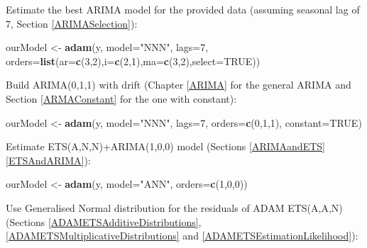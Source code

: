 \documentclass[]{book}
\newenvironment{Shaded}{\begin{snugshade}}{\end{snugshade}}
\newcommand{\DataTypeTok}[1]{\textcolor[rgb]{0.13,0.29,0.53}{#1}}
\newcommand{\DecValTok}[1]{\textcolor[rgb]{0.00,0.00,0.81}{#1}}
\newcommand{\KeywordTok}[1]{\textcolor[rgb]{0.13,0.29,0.53}{\textbf{#1}}}
\newcommand{\NormalTok}[1]{#1}
\newcommand{\OtherTok}[1]{\textcolor[rgb]{0.56,0.35,0.01}{#1}}
\newcommand{\StringTok}[1]{\textcolor[rgb]{0.31,0.60,0.02}{#1}}
\theoremstyle{definition}
\theoremstyle{definition}
\theoremstyle{definition}
\theoremstyle{definition}
\theoremstyle{remark}
\begin{document}
Estimate the best ARIMA model for the provided data (assuming seasonal lag of 7, Section \ref{ARIMASelection}):

\begin{Shaded}
\begin{Highlighting}[]
\NormalTok{ourModel <-}\StringTok{ }\KeywordTok{adam}\NormalTok{(y, }\DataTypeTok{model=}\StringTok{"NNN"}\NormalTok{, }\DataTypeTok{lags=}\DecValTok{7}\NormalTok{,}
                 \DataTypeTok{orders=}\KeywordTok{list}\NormalTok{(}\DataTypeTok{ar=}\KeywordTok{c}\NormalTok{(}\DecValTok{3}\NormalTok{,}\DecValTok{2}\NormalTok{),}\DataTypeTok{i=}\KeywordTok{c}\NormalTok{(}\DecValTok{2}\NormalTok{,}\DecValTok{1}\NormalTok{),}\DataTypeTok{ma=}\KeywordTok{c}\NormalTok{(}\DecValTok{3}\NormalTok{,}\DecValTok{2}\NormalTok{),}\DataTypeTok{select=}\OtherTok{TRUE}\NormalTok{))}
\end{Highlighting}
\end{Shaded}

Build ARIMA(0,1,1) with drift (Chapter \ref{ARIMA} for the general ARIMA and Section \ref{ARMAConstant} for the one with constant):

\begin{Shaded}
\begin{Highlighting}[]
\NormalTok{ourModel <-}\StringTok{ }\KeywordTok{adam}\NormalTok{(y, }\DataTypeTok{model=}\StringTok{"NNN"}\NormalTok{, }\DataTypeTok{lags=}\DecValTok{7}\NormalTok{,}
                 \DataTypeTok{orders=}\KeywordTok{c}\NormalTok{(}\DecValTok{0}\NormalTok{,}\DecValTok{1}\NormalTok{,}\DecValTok{1}\NormalTok{), }\DataTypeTok{constant=}\OtherTok{TRUE}\NormalTok{)}
\end{Highlighting}
\end{Shaded}

Estimate ETS(A,N,N)+ARIMA(1,0,0) model (Sections \ref{ARIMAandETS} \ref{ETSAndARIMA}):

\begin{Shaded}
\begin{Highlighting}[]
\NormalTok{ourModel <-}\StringTok{ }\KeywordTok{adam}\NormalTok{(y, }\DataTypeTok{model=}\StringTok{"ANN"}\NormalTok{, }\DataTypeTok{orders=}\KeywordTok{c}\NormalTok{(}\DecValTok{1}\NormalTok{,}\DecValTok{0}\NormalTok{,}\DecValTok{0}\NormalTok{))}
\end{Highlighting}
\end{Shaded}

Use Generalised Normal distribution for the residuals of ADAM ETS(A,A,N) (Sections \ref{ADAMETSAdditiveDistributions}, \ref{ADAMETSMultiplicativeDistributions} and \ref{ADAMETSEstimationLikelihood}):
\end{document}
